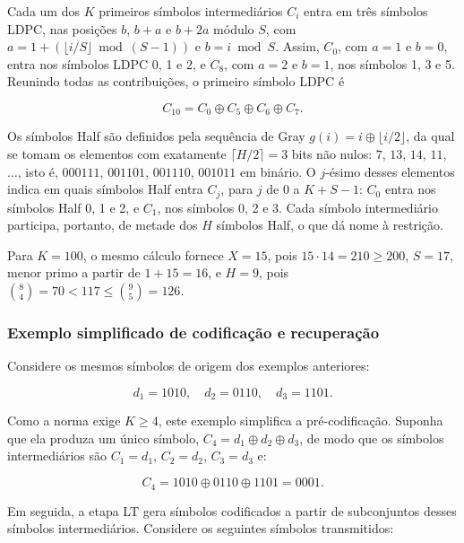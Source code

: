 Cada um dos $K$ primeiros símbolos intermediários $C_i$ entra em três símbolos LDPC, nas posições $b$, $b + a$ e $b + 2a$ módulo $S$, com $a = 1 + (\lfloor i/S \rfloor \bmod (S - 1))$ e $b = i \bmod S$. Assim, $C_0$, com $a = 1$ e $b = 0$, entra nos símbolos LDPC 0, 1 e 2, e $C_8$, com $a = 2$ e $b = 1$, nos símbolos 1, 3 e 5. Reunindo todas as contribuições, o primeiro símbolo LDPC é

\begin{equation}
C_{10} = C_0 \oplus C_5 \oplus C_6 \oplus C_7.
\end{equation}

Os símbolos Half são definidos pela sequência de Gray $g(i) = i \oplus \lfloor i/2 \rfloor$, da qual se tomam os elementos com exatamente $\lceil H/2 \rceil = 3$ bits não nulos: $7$, $13$, $14$, $11$, $\ldots$, isto é, $000111$, $001101$, $001110$, $001011$ em binário. O $j$-ésimo desses elementos indica em quais símbolos Half entra $C_j$, para $j$ de 0 a $K + S - 1$: $C_0$ entra nos símbolos Half 0, 1 e 2, e $C_1$, nos símbolos 0, 2 e 3. Cada símbolo intermediário participa, portanto, de metade dos $H$ símbolos Half, o que dá nome à restrição.

Para $K = 100$, o mesmo cálculo fornece $X = 15$, pois $15 \cdot 14 = 210 \ge 200$, $S = 17$, menor primo a partir de $1 + 15 = 16$, e $H = 9$, pois $\binom{8}{4} = 70 < 117 \le \binom{9}{5} = 126$.

\subsubsection{Exemplo simplificado de codificação e recuperação}%
Considere os mesmos símbolos de origem dos exemplos anteriores:

\begin{equation}
d_1 = 1010, \quad d_2 = 0110, \quad d_3 = 1101.
\end{equation}

Como a norma exige $K \ge 4$, este exemplo simplifica a pré-codificação. Suponha que ela produza um único símbolo, $C_4 = d_1 \oplus d_2 \oplus d_3$, de modo que os símbolos intermediários são $C_1=d_1$, $C_2=d_2$, $C_3=d_3$ e:

\begin{equation}
C_4 = 1010 \oplus 0110 \oplus 1101 = 0001.
\end{equation}

Em seguida, a etapa LT gera símbolos codificados a partir de subconjuntos desses símbolos intermediários. Considere os seguintes símbolos transmitidos:

